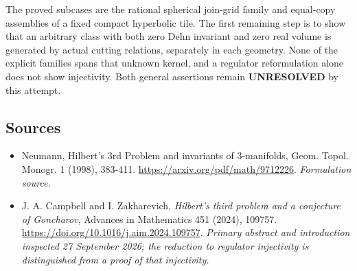 \documentclass[11pt]{article}
\begin{document}
The proved subcases are the rational spherical join-grid family and equal-copy assemblies of a fixed compact hyperbolic tile. The first remaining step is to show that an arbitrary class with both zero Dehn invariant and zero real volume is generated by actual cutting relations, separately in each geometry. None of the explicit families spans that unknown kernel, and a regulator reformulation alone does not show injectivity. Both general assertions remain \textbf{UNRESOLVED} by this attempt.

\subsection{Sources}
\begin{itemize}
\item[S1]Neumann, Hilbert's 3rd Problem and invariants of 3-manifolds, Geom. Topol. Monogr. 1 (1998), 383-411.
\url{https://arxiv.org/pdf/math/9712226}.
\textit{Formulation source.}
\item[E1]J. A. Campbell and I. Zakharevich, \emph{Hilbert's third problem and a conjecture of Goncharov}, Advances in Mathematics 451 (2024), 109757.
\url{https://doi.org/10.1016/j.aim.2024.109757}.
\textit{Primary abstract and introduction inspected 27 September 2026; the reduction to regulator injectivity is distinguished from a proof of that injectivity.}
\end{itemize}
\end{document}
